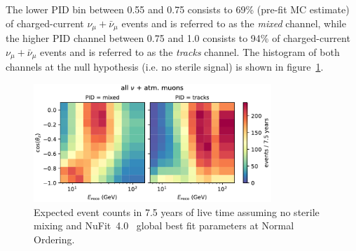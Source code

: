 The lower PID bin between 0.55 and 0.75 consists to 69\%  (pre-fit MC estimate) of charged-current $\nu_\mu + \bar{\nu}_\mu$ events and is referred to as the \emph{mixed} channel, while the higher PID channel between 0.75 and 1.0 consists to 94\% of charged-current $\nu_\mu + \bar{\nu}_\mu$ events and is referred to as the \emph{tracks} channel. The histogram of both channels at the null hypothesis (i.e. no sterile signal) is shown in figure~\ref{fig:nominal-hist-null-hypo}.

\begin{figure}
    \centering
    \includegraphics[width=0.8\textwidth]{figures/measurement/simulation_and_data/binning/plot_maps_total.pdf}
    \caption{Expected event counts in 7.5 years of live time assuming no sterile mixing and NuFit~4.0~\cite{nufit40} global best fit parameters at Normal Ordering.}
    \label{fig:nominal-hist-null-hypo}
\end{figure}


